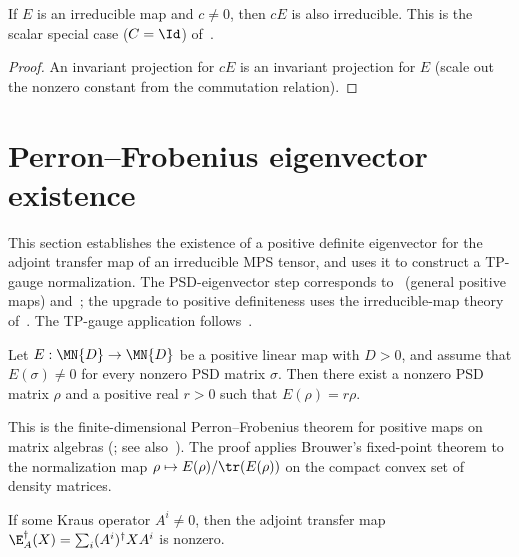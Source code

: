\begin{theorem}%
    \label{thm:irred_map_smul}
    \leanok
    If $E$ is an irreducible map and $c \neq 0$, then $c E$
    is also irreducible.
    This is the scalar special case ($C = \Id$) of~\cite[Proposition~6.6]{Wolf2012Quantum}.
\end{theorem}

\begin{proof}\leanok
    An invariant projection for $c E$ is an invariant projection
    for $E$ (scale out the nonzero constant from the commutation
    relation).
\end{proof}

\section{Perron--Frobenius eigenvector existence}%
\label{sec:pf_eigenvector}

This section establishes the existence of a positive definite
eigenvector for the adjoint transfer map of an irreducible MPS
tensor, and uses it to construct a TP-gauge normalization.
The PSD-eigenvector step corresponds to~\cite[Theorem~6.5]{Wolf2012Quantum}
(general positive maps) and~\cite{Evans1978Spectral}; the upgrade to positive
definiteness uses the irreducible-map theory of~\cite[Theorem~6.3]{Wolf2012Quantum}.
The TP-gauge application follows~\cite[Appendix~A]{Cirac2016MPDO_arXiv}.

\begin{theorem}%
    \label{thm:pf_eigenvector_existence}
    \leanok
    Let $E : \MN{D} \to \MN{D}$ be a positive linear map with
    $D > 0$, and assume that $E(\sigma) \neq 0$ for every nonzero
    PSD matrix $\sigma$.
    Then there exist a nonzero PSD matrix $\rho$ and a positive
    real $r > 0$ such that $E(\rho) = r \rho$.

    This is the finite-dimensional Perron--Frobenius theorem for
    positive maps on matrix algebras
    (\cite[Theorem~6.5]{Wolf2012Quantum}; see also~\cite{Evans1978Spectral}).
    The proof applies Brouwer's fixed-point theorem to the
    normalization map $\rho \mapsto E(\rho) / \tr(E(\rho))$ on the
    compact convex set of density matrices.
\end{theorem}

\begin{theorem}%
    \label{thm:adjoint_transfer_ne_zero}
    \leanok
    If some Kraus operator $A^i \neq 0$, then the adjoint transfer
    map $\E_A^\dagger(X) = \sum_i (A^i)^\dagger X A^i$ is nonzero.
\end{theorem}

